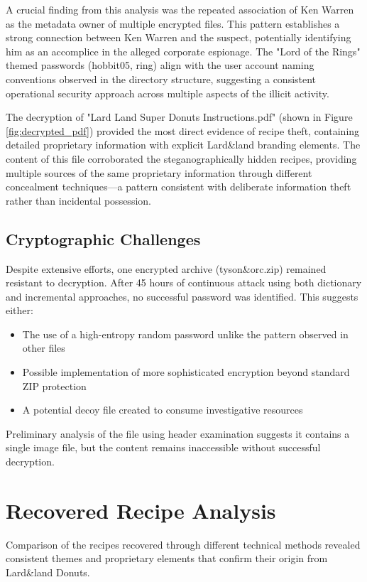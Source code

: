 A crucial finding from this analysis was the repeated association of Ken Warren as the metadata owner of multiple encrypted files. This pattern establishes a strong connection between Ken Warren and the suspect, potentially identifying him as an accomplice in the alleged corporate espionage. The "Lord of the Rings" themed passwords (hobbit05, ring) align with the user account naming conventions observed in the directory structure, suggesting a consistent operational security approach across multiple aspects of the illicit activity.

The decryption of "Lard Land Super Donuts Instructions.pdf" (shown in Figure \ref{fig:decrypted_pdf}) provided the most direct evidence of recipe theft, containing detailed proprietary information with explicit Lard\&land branding elements. The content of this file corroborated the steganographically hidden recipes, providing multiple sources of the same proprietary information through different concealment techniques—a pattern consistent with deliberate information theft rather than incidental possession.

\subsection{Cryptographic Challenges}
Despite extensive efforts, one encrypted archive (tyson\&orc.zip) remained resistant to decryption. After 45 hours of continuous attack using both dictionary and incremental approaches, no successful password was identified. This suggests either:

\begin{itemize}
    \item The use of a high-entropy random password unlike the pattern observed in other files
    \item Possible implementation of more sophisticated encryption beyond standard ZIP protection
    \item A potential decoy file created to consume investigative resources
\end{itemize}

Preliminary analysis of the file using header examination suggests it contains a single image file, but the content remains inaccessible without successful decryption.

\section{Recovered Recipe Analysis}
Comparison of the recipes recovered through different technical methods revealed consistent themes and proprietary elements that confirm their origin from Lard\&land Donuts.

